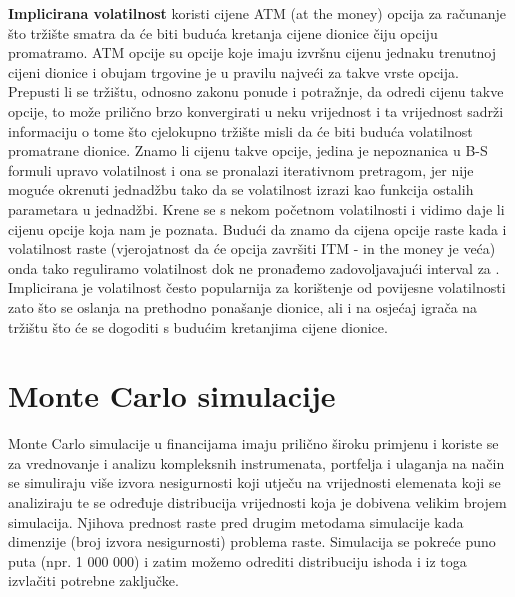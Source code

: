 \documentclass[times, utf8, seminar]{fer}
\begin{document}
\textbf{Implicirana volatilnost}  koristi cijene ATM (at the money) opcija za računanje što tržište smatra da će biti buduća kretanja cijene dionice čiju opciju promatramo. ATM opcije su opcije koje imaju izvršnu cijenu jednaku trenutnoj cijeni dionice i obujam trgovine je u pravilu najveći za takve vrste opcija. Prepusti li se tržištu, odnosno zakonu ponude i potražnje, da odredi cijenu takve opcije, to može prilično brzo konvergirati u neku vrijednost i ta vrijednost sadrži informaciju o tome što cjelokupno tržište misli da će biti buduća volatilnost promatrane dionice. Znamo li cijenu takve opcije, jedina je nepoznanica u B-S formuli upravo volatilnost i ona se pronalazi iterativnom pretragom, jer nije moguće okrenuti jednadžbu tako da se volatilnost izrazi kao funkcija ostalih parametara u jednadžbi. Krene se s nekom početnom volatilnosti i vidimo daje li cijenu opcije koja nam je poznata. Budući da znamo da cijena opcije raste kada i volatilnost raste (vjerojatnost da će opcija završiti ITM - in the money je veća) onda tako reguliramo volatilnost dok ne pronađemo zadovoljavajući interval za . Implicirana je volatilnost često popularnija za korištenje od povijesne volatilnosti zato što se oslanja na prethodno ponašanje dionice, ali i na osjećaj igrača na tržištu što će se dogoditi s budućim kretanjima cijene dionice.


\chapter{Monte Carlo simulacije}

Monte Carlo simulacije u financijama imaju prilično široku primjenu i koriste se za vrednovanje i analizu kompleksnih instrumenata, portfelja i ulaganja na način se simuliraju više izvora nesigurnosti koji utječu na vrijednosti elemenata koji se analiziraju te se određuje distribucija vrijednosti koja je dobivena velikim brojem simulacija. Njihova prednost raste pred drugim metodama simulacije kada dimenzije (broj izvora nesigurnosti) problema raste. Simulacija se pokreće puno puta (npr. 1 000 000) i zatim možemo odrediti distribuciju ishoda i iz toga izvlačiti potrebne zaključke.
\end{document}
